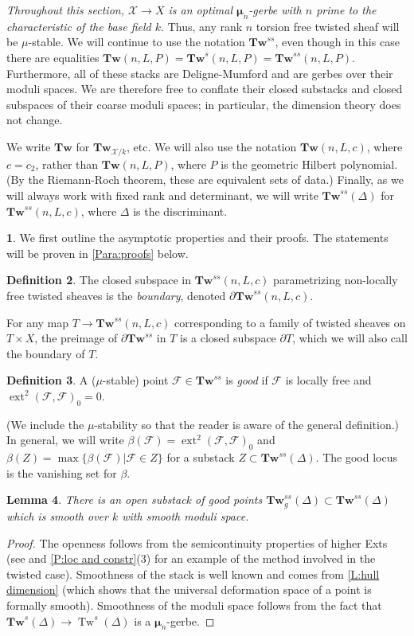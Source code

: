 \documentclass[11pt]{amsart}
\newcommand{\ms}[1]{\mathscr #1}
\newcommand{\m}{\boldsymbol{\mu}}
\DeclareMathOperator{\dimext}{ext}
\renewcommand{\[}{[\!\hspace{0.03em}[}
\renewcommand{\]}{]\!\hspace{0.03em}]}
\renewcommand{\(}{(\!\hspace{0.03em}(}
\renewcommand{\)}{)\!\hspace{0.03em})}
\newcommand{\Tw}{\mathbf{Tw}}
\DeclareMathOperator{\mTw}{Tw}
\newtheorem{lem}{Lemma}[subsubsection]%
\theoremstyle{definition}
\newtheorem{defn}[lem]{Definition}
\newtheorem{para}[lem]{\indent}
\theoremstyle{remark}
\begin{document}
\emph{Throughout this section, $\ms X\to X$ is an optimal $\m_{n}$-gerbe 
with $n$ prime to the characteristic of the base field $k$\/}.  
Thus, any rank $n$ torsion free twisted sheaf will be $\mu$-stable.  
We will continue to use the notation $\Tw^{ss}$, even though in this 
case there are equalities 
$\Tw(n,L,P)=\Tw^{s}(n,L,P)=\Tw^{ss}(n,L,P)$.  Furthermore, all of 
these stacks are Deligne-Mumford and are gerbes over their moduli 
spaces.  We are therefore free to conflate 
their closed substacks and closed subspaces of their coarse moduli 
spaces; in particular, the dimension theory does not change.

We write $\Tw$ for 
$\Tw_{\ms X/k}$, etc.  We will also use the notation $\Tw(n,L,c)$, 
where $c=c_{2}$, rather than $\Tw(n,L,P)$, where $P$ is the geometric 
Hilbert polynomial.  (By the Riemann-Roch theorem, these are 
equivalent sets of data.)  Finally, as we will always work with fixed 
rank and determinant, we will write $\Tw^{ss}(\Delta)$ for 
$\Tw^{ss}(n,L,c)$, where $\Delta$ is the discriminant.

\begin{para} We first outline the asymptotic properties and their 
proofs.  The statements will be proven in \ref{Para:proofs} below.
\end{para}
\begin{defn} The closed subspace in $\Tw^{ss}(n,L,c)$ parametrizing 
non-locally free twisted sheaves is the \emph{boundary\/}, denoted 
$\partial\Tw^{ss}(n,L,c)$. 
\end{defn}
For any map $T\to\Tw^{ss}(n,L,c)$ 
corresponding to a family of twisted sheaves on $T\times X$, the 
preimage of $\partial\Tw^{ss}$ in $T$ is a closed subspace 
$\partial T$, which we will also call the boundary of $T$.

\begin{defn} A ($\mu$-stable) point $\ms F\in\Tw^{ss}$ is \emph{good\/} if $\ms F$ is 
locally free and $\dimext^{2}(\ms F,\ms F)_{0}=0$.
\end{defn}
(We include the $\mu$-stability so that the reader is aware of the 
general definition.)  In general, we will write $\beta(\ms 
F)=\dimext^{2}(\ms F,\ms F)_{0}$ and $\beta(Z)=\max\{\beta(\ms F)|\ms 
F\in Z\}$ for a substack $Z\subset\Tw^{ss}(\Delta)$.  The good locus 
is the vanishing set for $\beta$.

\begin{lem}\label{L:good open} There is an open substack of good points 
$\Tw^{ss}_{g}(\Delta)\subset\Tw^{ss}(\Delta)$ which is smooth over $k$ 
with smooth moduli space.
\end{lem}
\begin{proof} The openness follows from the semicontinuity properties 
of higher Exts (see \cite{banica} and \ref{P:loc and constr}(3) for 
an example of the method involved in the twisted case).  Smoothness of the stack is well known and 
comes from \ref{L:hull dimension} (which shows that the universal 
deformation space of a point is formally smooth).  Smoothness of the 
moduli space follows from the fact that 
$\Tw^{s}(\Delta)\to\mTw^{s}(\Delta)$ is a $\m_{n}$-gerbe.
\end{proof}
\end{document}
